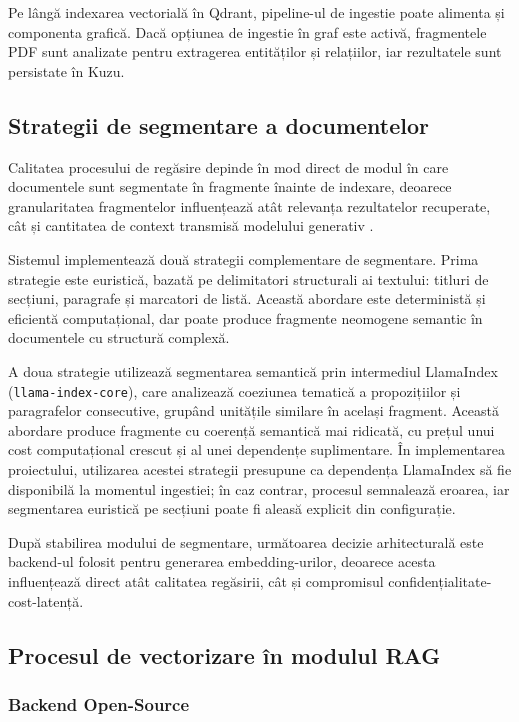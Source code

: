 \documentclass[12pt, a4paper, oneside, romanian]{teza-upb}
\begin{document}
Pe lângă indexarea vectorială în Qdrant, pipeline-ul de ingestie poate alimenta și componenta grafică. Dacă opțiunea de ingestie în graf este activă, fragmentele PDF sunt analizate pentru extragerea entităților și relațiilor, iar rezultatele sunt persistate în Kuzu.

\subsection{Strategii de segmentare a documentelor}

Calitatea procesului de regăsire depinde în mod direct de modul în care documentele sunt segmentate în fragmente înainte de indexare, deoarece granularitatea fragmentelor influențează atât relevanța rezultatelor recuperate, cât și cantitatea de context transmisă modelului generativ \cite{gao2023retrieval}.

Sistemul implementează două strategii complementare de segmentare. Prima strategie este euristică, bazată pe delimitatori structurali ai textului: titluri de secțiuni, paragrafe și marcatori de listă. Această abordare este deterministă și eficientă computațional, dar poate produce fragmente neomogene semantic în documentele cu structură complexă.

A doua strategie utilizează segmentarea semantică prin intermediul LlamaIndex (\texttt{llama-index-core}), care analizează coeziunea tematică a propozițiilor și paragrafelor consecutive, grupând unitățile similare în același fragment. Această abordare produce fragmente cu coerență semantică mai ridicată, cu prețul unui cost computațional crescut și al unei dependențe suplimentare. În implementarea proiectului, utilizarea acestei strategii presupune ca dependența LlamaIndex să fie disponibilă la momentul ingestiei; în caz contrar, procesul semnalează eroarea, iar segmentarea euristică pe secțiuni poate fi aleasă explicit din configurație.

După stabilirea modului de segmentare, următoarea decizie arhitecturală este backend-ul folosit pentru generarea embedding-urilor, deoarece acesta influențează direct atât calitatea regăsirii, cât și compromisul confidențialitate-cost-latență.

\subsection{Procesul de vectorizare în modulul RAG}

\subsubsection{Backend Open-Source}
\end{document}
